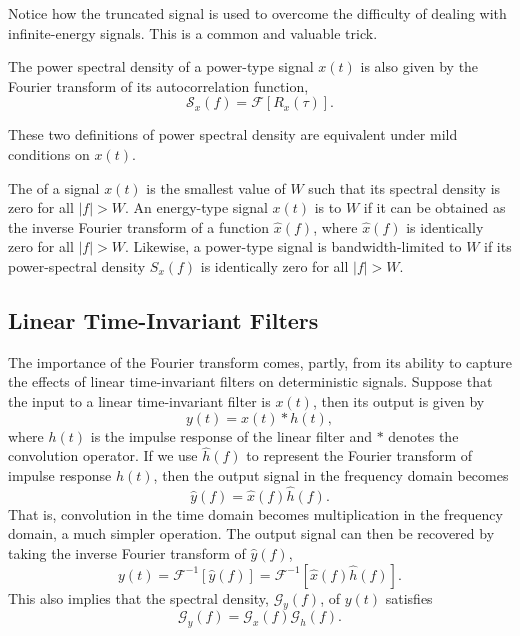 Notice how the truncated signal is used to overcome the difficulty of dealing with infinite-energy signals.
This is a common and valuable trick.

\begin{definition}
The power spectral density of a power-type signal $x(t)$ is also given by the Fourier transform of its autocorrelation function,
\begin{equation*}
\mathcal{S}_x (f) = \mathcal{F} [ R_x (\tau) ].
\end{equation*}
\end{definition}
These two definitions of power spectral density are equivalent under mild conditions on $x(t)$.

The  of a signal $x(t)$ is the smallest value of $W$ such that its spectral density is zero for all $|f| > W$.
An energy-type signal $x(t)$ is  to $W$ if it can be obtained as the inverse Fourier transform of a function $\hat{x}(f)$, where $\hat{x}(f)$ is identically zero for all $|f| > W$.
Likewise, a power-type signal is bandwidth-limited to $W$ if its power-spectral density $S_x (f)$ is identically zero for all $|f| > W$.

\subsection{Linear Time-Invariant Filters}
\label{subsection:LinearTimeInvariantFilters}

The importance of the Fourier transform comes, partly, from its ability to capture the effects of linear time-invariant filters on deterministic signals.
Suppose that the input to a linear time-invariant filter is $x(t)$, then its output is given by
\begin{equation*}
y(t) = x(t) \ast h(t),
\end{equation*}
where $h(t)$ is the impulse response of the linear filter and $\ast$ denotes the convolution operator.
If we use $\hat{h}(f)$ to represent the Fourier transform of impulse response $h(t)$, then the output signal in the frequency domain becomes
\begin{equation*}
\hat{y}(f) = \hat{x}(f) \hat{h}(f) .
\end{equation*}
That is, convolution in the time domain becomes multiplication in the frequency domain, a much simpler operation.
The output signal can then be recovered by taking the inverse Fourier transform of $\hat{y}(f)$,
\begin{equation*}
y(t) = \mathcal{F}^{-1} [ \hat{y}(f) ] = \mathcal{F}^{-1} [ \hat{x}(f) \hat{h}(f) ] .
\end{equation*}
This also implies that the spectral density, $\mathcal{G}_y(f)$, of $y(t)$ satisfies
\[ \mathcal{G}_y(f) = \mathcal{G}_x(f) \mathcal{G}_h(f). \]


